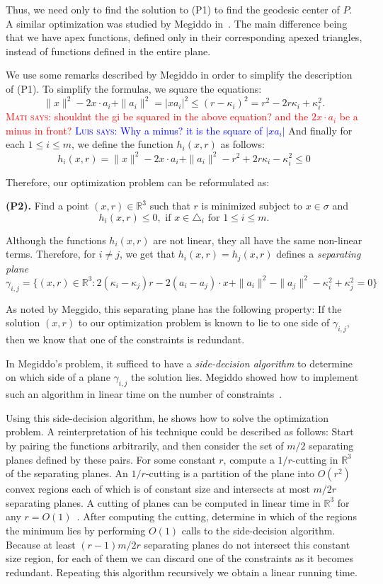 \documentclass[a4paper,UKenglish]{lipics}
\newcommand{\cell}{\ensuremath{\sigma}}
\newcommand{\marrow}{\marginpar[\hfill$\longrightarrow$]{$\longleftarrow$}}
\newcommand{\niceremark}[3]{\textcolor{red}{\textsc{#1 #2:} \marrow\textsf{#3}}}
\newcommand{\niceremarkblue}[3]{\textcolor{blue}{\textsc{#1 #2:} \marrow\textsf{#3}}}
\newcommand{\luis}[2][says]{\niceremarkblue{Luis}{#1}{#2}}
\newcommand{\mati}[2][says]{\niceremark{Mati}{#1}{#2}}
\begin{document}
Thus, we need only to find the solution to (P1) to find the geodesic center of $P$.
A similar optimization was studied by Megiddo in~\cite{megiddo1989ball}. 
The main difference being that we have apex functions, defined only in their corresponding apexed triangles, instead of functions defined in the entire plane. 

We use some remarks described by Megiddo in order to simplify the description of (P1).
To simplify the formulas, we square the equations:
$$\|x\|^2 - 2x\cdot a_i + \|a_i\|^2  = |x a_i|^2 \leq (r - \kappa_i)^2 = r^2 - 2r\kappa_i + \kappa_i^2.$$ 
\mati{shouldnt the gi be squared in the above equation? and the $2x\cdot a_i$ be a minus in front?} \luis{Why a minus? it is the square of $|xa_i|$}
And finally for each $1\leq i\leq m$, we define the function $h_i(x, r)$ as follows:
$$h_i(x, r) = \|x\|^2 - 2x\cdot a_i + \|a_i\|^2  - r^2 + 2r\kappa_i - \kappa_i^2 \leq 0$$

Therefore, our optimization problem can be reformulated as:

\textbf{(P2).} Find a point $(x,r)\in \mathbb{R}^3$ such that $r$ is minimized subject to $x\in \cell$ and 
$$h_i(x, r) \leq 0, \text{ if $x\in \triangle_{i}$ for $1\leq i \leq m$}.$$%

Although the functions $h_i(x,r)$ are not linear, they all have the same non-linear terms. Therefore, for $i\neq j$, we get that
$h_i(x,r) = h_j(x, r)$ defines a \emph{separating plane}
$$\gamma_{i,j} = \{(x, r) \in \mathbb{R}^3:  2( \kappa_i - \kappa_j) r - 2 (a_i - a_j) \cdot x + \|a_i\|^2 - \|a_j\|^2 - \kappa_i^2 + \kappa_j^2 = 0\}$$

As noted by Meggido, this separating plane has the following property:
If the solution $(x, r)$ to our optimization problem is known to lie to one side of $\gamma_{i,j}$, then we know that one of the constraints is redundant. 

In Megiddo's problem, it sufficed to have a \emph{side-decision algorithm} to determine on which side of a plane $\gamma_{i,j}$ the solution lies. Megiddo showed how to implement such an algorithm in linear time on the number of constraints~\cite{megiddo1989ball}.

Using this side-decision algorithm, he shows how to solve the optimization problem. A reinterpretation of his technique could be described as follows: Start by pairing the functions arbitrarily, and then consider the set of $m/2$ separating planes defined by these pairs.
For some constant $r$, compute a $1/r$-cutting in $\mathbb{R}^3$ of the separating planes.
An $1/r$-cutting is a partition of the plane into $O(r^2)$ convex regions each of which is of constant size and intersects at most $m/2r$ separating planes.
A cutting of planes can be computed in linear time in $\mathbb{R}^3$ for any $r = O(1)$~\cite{matousekCuttings}.
After computing the cutting, determine in which of the regions the minimum lies by performing $O(1)$ calls to the side-decision algorithm. 
Because at least $(r-1)m/2r$ separating planes do not intersect this constant size region, for each of them we can discard one of the constraints as it becomes redundant. Repeating this algorithm recursively we obtain a linear running time.
\end{document}
